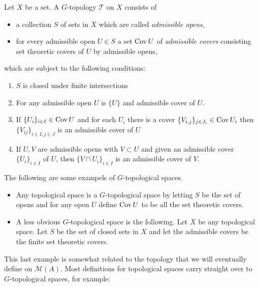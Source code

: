 \begin{definition}
	[$G$-topology]
	Let $X$ be a set. 
	A $G$-topology $\mathcal{T} $ on $X $ consists of 
	\begin{itemize}
		\item  a collection $S$ of sets in $X$ which are called \emph{admissible opens},
		\item for every admissible open $U \in S$ a set $\operatorname{Cov} U$ of \emph{admissible covers} consisting set theoretic covers of $U$ by admissible opens,
	\end{itemize}
	which are subject to the following conditions:
	\begin{enumerate}
		\item $S$ is closed under finite intersections
		\item For any admissible open $U$ is $\{U\}$ and admissible cover of $U$.
		\item If $\{U_i\}_{i \in I} \in \operatorname{Cov} U $ and for each $U_i$ there is a cover $\{V_{i, j}\}_{j \in J_i} \in \operatorname{Cov} U_i$ then $\{V_{ij}\} _{i \in I, j \in J}$ is an admissible cover of $U$
		\item If  $U, V$ are admissible opens with $V \subset  U$ and given an admissible cover $\{U_i\}_{i \in I} $ of $U$, then $\{V \cap U_i\} _{i \in I}$ is an admissible cover of $V$. 
	\end{enumerate}
\end{definition}
\begin{example}
	The following are some exampels of $G $-topological spaces. 
	\begin{itemize}
		\item Any topological space is a $G$-topological space by letting $S$ be the set of opens and for any open  $U$ define $\operatorname{Cov} U$ to be all the set theoretic covers. 
		\item A less obvious $G$-topological space is the following. 
			Let $X$ be any topological space. 
			Let $S$ be the set of closed sets in $X$ and let the admissible covers be the finite set theoretic covers. 
	\end{itemize}
\end{example}
This last example is somewhat related to the topology that we will eventually define on $\mathcal{M} (A)$. 
Most definitions for topological spaces carry straight over to $G$-topological spaces, for example: 
